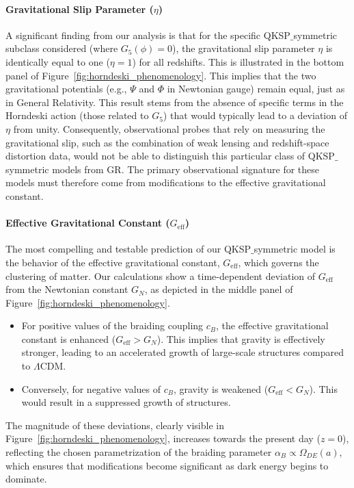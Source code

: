 \documentclass[twocolumn]{aastex631}
\begin{document}
\paragraph{Gravitational Slip Parameter ($\eta$)}
A significant finding from our analysis is that for the specific QKSP\ensuremath{\_}symmetric subclass considered (where $G_5(\phi)=0$), the gravitational slip parameter $\eta$ is identically equal to one ($\eta=1$) for all redshifts. This is illustrated in the bottom panel of \mbox{Figure \ref{fig:horndeski_phenomenology}}. This implies that the two gravitational potentials (e.g., $\Psi$ and $\Phi$ in Newtonian gauge) remain equal, just as in General Relativity. This result stems from the absence of specific terms in the Horndeski action (those related to $G_5$) that would typically lead to a deviation of $\eta$ from unity. Consequently, observational probes that rely on measuring the gravitational slip, such as the combination of weak lensing and redshift-space distortion data, would not be able to distinguish this particular class of QKSP\ensuremath{\_}symmetric models from GR. The primary observational signature for these models must therefore come from modifications to the effective gravitational constant.

\paragraph{Effective Gravitational Constant ($G_{\text{eff}}$)}
The most compelling and testable prediction of our QKSP\ensuremath{\_}symmetric model is the behavior of the effective gravitational constant, $G_{\text{eff}}$, which governs the clustering of matter. Our calculations show a time-dependent deviation of $G_{\text{eff}}$ from the Newtonian constant $G_N$, as depicted in the middle panel of \mbox{Figure \ref{fig:horndeski_phenomenology}}.
\begin{itemize}
    \item For positive values of the braiding coupling $c_B$, the effective gravitational constant is enhanced ($G_{\text{eff}} > G_N$). This implies that gravity is effectively stronger, leading to an accelerated growth of large-scale structures compared to $\Lambda$CDM.
    \item Conversely, for negative values of $c_B$, gravity is weakened ($G_{\text{eff}} < G_N$). This would result in a suppressed growth of structures.
\end{itemize}
The magnitude of these deviations, clearly visible in \mbox{Figure \ref{fig:horndeski_phenomenology}}, increases towards the present day ($z=0$), reflecting the chosen parametrization of the braiding parameter $\alpha_B \propto \Omega_{DE}(a)$, which ensures that modifications become significant as dark energy begins to dominate.
\end{document}
